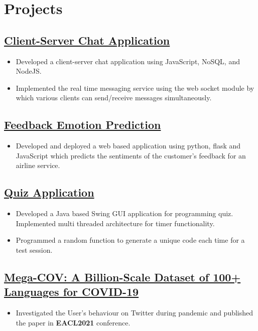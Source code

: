 \documentclass[a4paper,11pt]{article}
\begin{document}
\section{Projects}
\subsection{\href{https://github.com/vkunal1996/CPEN400-ChatApp}{Client-Server Chat Application}}
\begin{itemize}
    \item Developed a client-server chat application using JavaScript, NoSQL, and NodeJS.
    \item Implemented the real time messaging service using the web socket module by which various clients can send/receive messages simultaneously.
\end{itemize}
\subsection{\href{http://knowyoursentiment.herokuapp.com}{Feedback Emotion Prediction}}
\begin{itemize}
    \item Developed and deployed a web based application using python, flask and JavaScript which predicts the sentiments of the customer's feedback for an airline service. 
\end{itemize}
\subsection{\href{https://github.com/vkunal1996/CodeHunt-Desktop-Based-Application}{Quiz Application}}
\begin{itemize}
    \item Developed a Java based Swing GUI application for programming quiz. Implemented multi threaded architecture for timer functionality.
    \item Programmed a random function to generate a unique code each time for a test session. 
\end{itemize}
\subsection{\href{https://arxiv.org/abs/2005.06012}{Mega-COV: A Billion-Scale Dataset of 100+ Languages for COVID-19}}
\begin{itemize}
    \item Investigated the User's behaviour on Twitter during pandemic and published the paper in \textbf{EACL2021} conference. 
\end{itemize}
\end{document}
